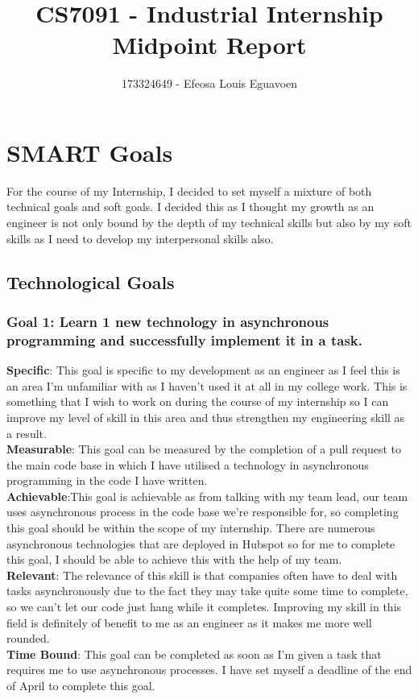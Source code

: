 \documentclass[11pt]{article} %
\title{CS7091 - Industrial Internship Midpoint Report}
\author{173324649 - Efeosa Louis Eguavoen}
\begin{document}
\maketitle

\section{SMART Goals}
For the course of my Internship, I decided to set myself a mixture of both technical goals and soft goals. I decided this as I thought my growth as an engineer is not only bound by the depth of my technical skills but also by my soft skills as I need to develop my interpersonal skills also.

\subsection{Technological Goals}
\subsubsection{Goal 1: Learn 1 new technology in asynchronous programming and successfully implement it in a task.}
\textbf{Specific}: This goal is specific to my development as an engineer as I feel this is an area I'm unfamiliar with as I haven't used it at all in my college work.  This is something that I wish to work on during the course of my internship so I can improve my level of skill in this area and thus strengthen my engineering skill as a result. 
\\ \textbf{Measurable}: This goal can be measured by the completion of a pull request to the main code base in which I have utilised a technology in asynchronous programming in the code I have written. 
\\ \textbf{Achievable}:This goal is achievable as from talking with my team lead,  our team uses asynchronous process in the code base we're responsible for,  so completing this goal should be within the scope of my internship.  There are numerous asynchronous technologies that are deployed in Hubspot so for me to complete this goal, I should be able to achieve this with the help of my team.
\\ \textbf{Relevant}: The relevance of this skill is that companies often have to deal with tasks asynchronously due to the fact they may take quite some time to complete,  so we can't let our code just hang while it completes.  Improving my skill in this field is definitely of benefit to me as an engineer as it makes me more well rounded. 
\\ \textbf{Time Bound}: This goal can be completed as soon as I'm given a task that requires me to use asynchronous processes.  I have set myself a deadline of the end of April to complete this goal. 
\end{document}
